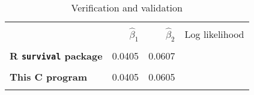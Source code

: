 \documentclass{article}
\begin{document}
\begin{table}[h!]
	\caption{Verification and validation}
	\centering
	\begin{tabular}{|l r r r|}
		\hline
		& & & \\
		& $\hat{\beta}_1$ & $\hat{\beta}_2$  & Log likelihood\\
		& & & \\
		\textbf{R \texttt{survival} package} & 0.0405 & 0.0607&           \\
		& & & \\
		\textbf{This C program} & 0.0405  &  0.0605&       \\
		& & & \\
		\hline
	\end{tabular}
\end{table}
\end{document}
